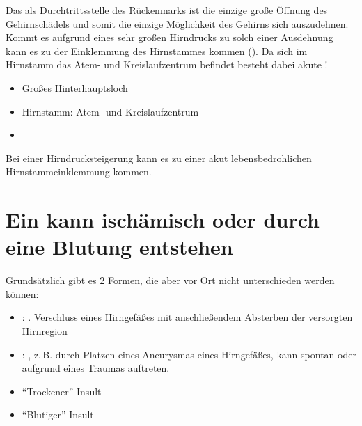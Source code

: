 {%
%
\label{topic:hirnstammeinklemmung}
Das  als Durchtrittsstelle
des Rückenmarks ist die einzige große Öffnung des Gehirnschädels und somit  
die einzige Möglichkeit des Gehirns sich auszudehnen. 
%
Kommt es aufgrund eines sehr großen Hirndrucks zu solch einer Ausdehnung 
kann es zu der Einklemmung des Hirnstammes kommen 
(). 
%
Da sich im Hirnstamm das Atem- und Kreislaufzentrum befindet 
besteht dabei akute !
}
{%
\begin{itemize}
  \item Großes Hinterhauptsloch
  \item Hirnstamm: Atem- und Kreislaufzentrum
  \item {}
\end{itemize}
}

\begin{Danger}
  \item Bei einer Hirndrucksteigerung kann es zu einer akut lebensbedrohlichen 
  Hirnstammeinklemmung kommen.
\end{Danger}

\clearpage%

\section{Ein  kann ischämisch oder durch eine Blutung entstehen }
\label{topic:insult}
\label{topic:schlaganfall}



{%
Grundsätzlich gibt es 2 Formen, die aber vor Ort nicht
unterschieden werden können:
\begin{itemize}
  \item {}:
  . Verschluss eines
  Hirngefäßes mit anschließendem Absterben der versorgten Hirnregion
  \item {}: , z.\,B.
  durch Platzen eines Aneurysmas eines Hirngefäßes, kann spontan
  oder aufgrund eines Traumas auftreten.
\end{itemize}

}
{
\begin{itemize}
  \item \enquote{Trockener} Insult
  \item \enquote{Blutiger} Insult
\end{itemize}

}{}{}{}

